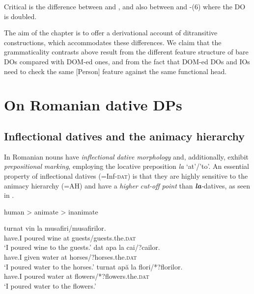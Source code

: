 \documentclass[output=paper,colorlinks,citecolor=brown,nonflat]{./langscibook}
\begin{document}
          


Critical is the difference between  and , and also between  and -(6) where the DO is doubled.

The aim of the chapter is to offer a derivational account of ditransitive constructions, which accommodates these differences. We claim that the grammaticality contrasts above result from the different feature structure of bare DOs compared with DOM-ed ones, and from the fact that DOM-ed DOs and IOs need to check the same [Person] feature against the same functional head.

\section{On Romanian dative DPs} %

\subsection{Inflectional datives and the animacy hierarchy} %

In Romanian nouns have \textit{inflectional} \textit{dative} \textit{morphology} and, additionally, exhibit \textit{prepositional} \textit{marking}, employing the locative preposition \textit{la} ‘at’/’to’. An essential property of inflectional datives (=Inf-\textsc{dat}) is that they are highly sensitive to the animacy hierarchy (=AH) and have a \textit{higher} \textit{cut-off} \textit{point} than \textbf{\textit{la}}\textit{{}-}datives, as seen in . 

\ea%
    \label{ex:cornilescu:7}
    human > animate > inanimate
    \z

         

\ea%
    \label{ex:cornilescu:8}
    \ea \label{ex:cornilescu:8a}
       {turnat}  {vin}   {la} musafiri/musafirilor.	\\
       	 have.I   poured   wine   at guests/guests.the.\textsc{dat}	 \\
    \glt ‘I poured wine to the guests.’
    \ex \label{ex:cornilescu:8b}
    	 {dat}    {apa}  {la} cai/{?}cailor. 	\\
    	have.I given   water   at horses/{?}horses.the.\textsc{dat} \\
    	\glt ‘I poured water to the horses.’
    \ex  \label{ex:cornilescu:8c}
     {turnat}  {apă}  {la} flori/*?florilor.	\\
     		have.I poured   water   at flowers/*?flowers.the.\textsc{dat} \\
    \glt	‘I poured water to the flowers.’
   	\z 
    \z
\end{document}
